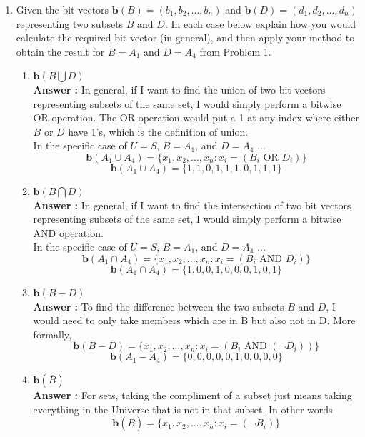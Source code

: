 \documentclass[a4paper,11pt]{article}
\begin{document}
\begin{enumerate}
\begin{enumerate}
  \end{enumerate}



\item Given the bit vectors $\textbf{b}(B) = (b_1, b_2, . . . , b_n)$ and $\textbf{b}(D) = (d_1, d_2, . . . , d_n)$ representing two
subsets $B$ and $D$. In each case below explain how you would calculate the required bit vector (in
general), and then apply your method to obtain the result for $B = A_1$ and $D = A_4$ from Problem 1.
  \begin{enumerate}
  \item $\textbf{b}( B \bigcup D)$ \\
  \textbf{Answer :} In general, if I want to find the union of two bit vectors representing subsets of the same set, I would simply perform a bitwise OR operation. The OR operation would put a 1 at any index where either $B$ or $D$ have 1's, which is the definition of union. \\ In the specific case of $U = S$, $B = A_1$, and $D = A_4$ ...
  \[ \textbf{b}(A_1 \cup A_4) = \{ x_1, x_2, ..., x_n : x_i = (B_i\text{ OR }D_i)\}\]
  \[ \textbf{b}(A_1 \cup A_4) = \{ 1, 1, 0, 1, 1, 1, 0, 1, 1, 1 \}\]

  \item $ \textbf{b}( B \bigcap D) $ \\
  \textbf{Answer :} In general, if I want to find the intersection of two bit vectors representing subsets of the same set, I would simply perform a bitwise AND operation.\\ In the specific case of $U = S$, $B = A_1$, and $D = A_4$ ...
  \[ \textbf{b}(A_1 \cap A_4) = \{ x_1, x_2, ..., x_n : x_i = (B_i\text{ AND }D_i)\}\]
  \[ \textbf{b}(A_1 \cap A_4) = \{ 1, 0, 0, 1, 0, 0, 0, 1, 0, 1 \}\]
  
  \item $ \textbf{b}( B - D) $ \\
  \textbf{Answer :} To find the difference between the two subsets $B$ and $D$, I would need to only take members which are in B but also not in D. More formally,
  \[ \textbf{b}(B - D) = \{ x_1, x_2, ..., x_n : x_i = (B_i\text{ AND }(\neg D_i))\}\]
  \[ \textbf{b}(A_1 - A_4) = \{ 0, 0, 0, 0, 0, 1, 0, 0, 0, 0 \}\]

  \item $ \textbf{b}( \overline{B}) $ \\
  \textbf{Answer :} For sets, taking the compliment of a subset just means taking everything in the Universe that is not in that subset.  In other words
  \[ \textbf{b}(\overline{B}) = \{ x_1, x_2, ..., x_n : x_i = (\neg B_i)\}\]
  \end{enumerate}

\end{enumerate}
\end{document}

